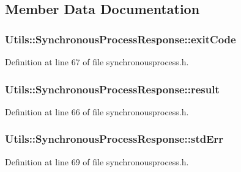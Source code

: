 \subsection{Member Data Documentation}
\hypertarget{struct_utils_1_1_synchronous_process_response_addc9fc8217e8275e96b9426afc976a21}{
\subsubsection[{exit\-Code}]{ Utils\-::\-Synchronous\-Process\-Response\-::exit\-Code}}\label{struct_utils_1_1_synchronous_process_response_addc9fc8217e8275e96b9426afc976a21}


Definition at line 67 of file synchronousprocess.\-h.

\hypertarget{struct_utils_1_1_synchronous_process_response_a292da97b1219d5bf29bdcc96ddeaee91}{
\subsubsection[{result}]{ Utils\-::\-Synchronous\-Process\-Response\-::result}}\label{struct_utils_1_1_synchronous_process_response_a292da97b1219d5bf29bdcc96ddeaee91}


Definition at line 66 of file synchronousprocess.\-h.

\hypertarget{struct_utils_1_1_synchronous_process_response_a328fa8fa6a704de6827a005d7e00bd82}{
\subsubsection[{std\-Err}]{ Utils\-::\-Synchronous\-Process\-Response\-::std\-Err}}\label{struct_utils_1_1_synchronous_process_response_a328fa8fa6a704de6827a005d7e00bd82}


Definition at line 69 of file synchronousprocess.\-h.

